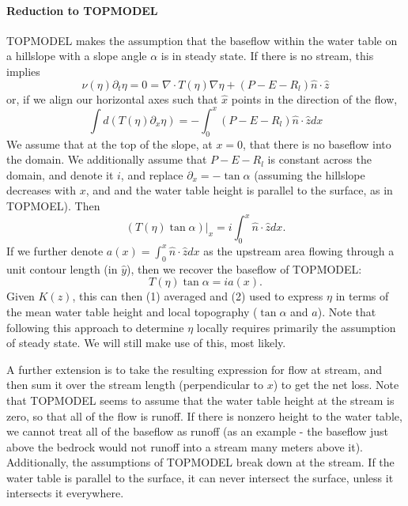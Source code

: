 \documentclass[twoside,10pt]{report}
\begin{document}
\paragraph{Reduction to TOPMODEL}
TOPMODEL makes the assumption that the baseflow within the water table on a hillslope with a slope angle $\alpha$ is in steady state. If there is no stream, this implies
\begin{equation}
    \nu(\eta)\partial_t \eta=0  = \nabla \cdot T(\eta)\nabla \eta + (P-E-R_l)\hat{n} \cdot \hat{z}
\end{equation}
or, if we align our horizontal axes such that $\hat{x}$ points in the direction of the flow,
\begin{equation}
     \int d(T(\eta) \partial_x \eta) = -\int_0^x(P-E-R_l)\hat{n} \cdot \hat{z} dx
\end{equation}
We assume that at the top of the slope, at $x=0$, that there is no baseflow into the domain. We additionally assume that $P-E-R_l$ is constant across the domain, and denote it $i$, and replace $\partial_x = -\tan \alpha$ (assuming the hillslope decreases with $x$, and and the water table height is parallel to the surface, as in TOPMOEL). Then
\begin{equation}
     (T(\eta)\tan \alpha)\bigg|_x = i\int_0^x\hat{n} \cdot \hat{z} dx.
\end{equation}
If we further denote $a(x) = \int_0^x\hat{n} \cdot \hat{z} dx$ as the upstream area flowing through a unit contour length (in $\hat{y}$), then we recover the baseflow of TOPMODEL:
\begin{equation}
    T(\eta)\tan \alpha  = ia(x).
\end{equation}
Given $K(z)$, this can then (1) averaged and (2) used to express $\eta$ in terms of the mean water table height and local topography ($\tan\alpha$ and $a$). Note that following this approach to determine $\eta$ locally requires primarily the assumption of steady state. We will still make use of this, most likely.  

A further extension is to take the resulting expression for flow at stream, and then sum it over the stream length (perpendicular to $x$) to get the net loss. Note that TOPMODEL seems to assume that the water table height at the stream is zero, so that all of the flow is runoff. If there is nonzero height to the water table, we cannot treat all of the baseflow as runoff (as an example - the baseflow just above the bedrock would not runoff into a stream many meters above it). Additionally, the assumptions of TOPMODEL break down at the stream. If the water table is parallel to the surface, it can never intersect the surface, unless it intersects it everywhere. 
\end{document}
